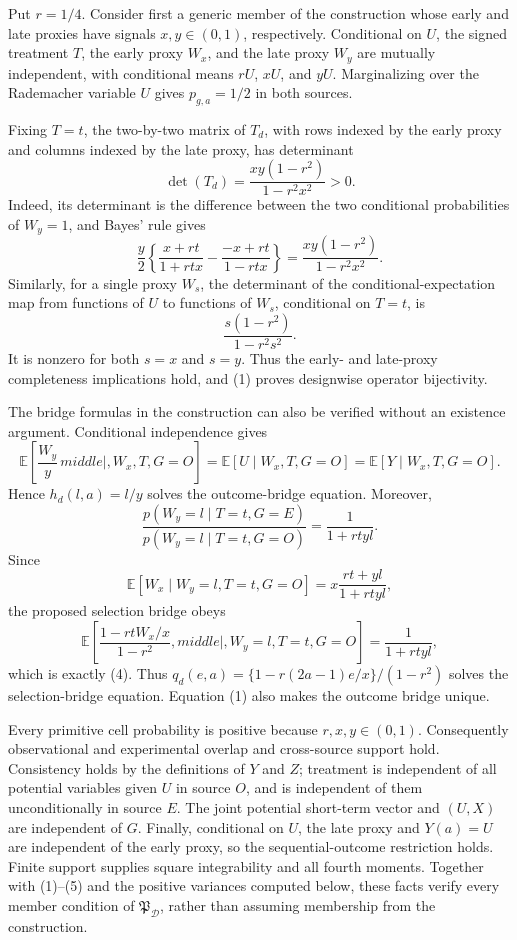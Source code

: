 Put \(r=1/4\).  Consider first a generic member of the construction whose early and late proxies have signals \(x,y\in(0,1)\), respectively.  Conditional on \(U\), the signed treatment \(T\), the early proxy \(W_x\), and the late proxy \(W_y\) are mutually independent, with conditional means \(rU\), \(xU\), and \(yU\).  Marginalizing over the Rademacher variable \(U\) gives \(p_{g,a}=1/2\) in both sources.

Fixing \(T=t\), the two-by-two matrix of \(T_d\), with rows indexed by the early proxy and columns indexed by the late proxy, has determinant
\[
 \det(T_d)=\frac{xy(1-r^2)}{1-r^2x^2}>0. \tag{1}
\]
Indeed, its determinant is the difference between the two conditional probabilities of \(W_y=1\), and Bayes' rule gives
\[
 \frac y2\left\{
 \frac{x+rt}{1+rtx}-\frac{-x+rt}{1-rtx}
 \right\}
 =\frac{xy(1-r^2)}{1-r^2x^2}.
\]
Similarly, for a single proxy \(W_s\), the determinant of the conditional-expectation map from functions of \(U\) to functions of \(W_s\), conditional on \(T=t\), is
\[
 \frac{s(1-r^2)}{1-r^2s^2}. \tag{2}
\]
It is nonzero for both \(s=x\) and \(s=y\).  Thus the early- and late-proxy completeness implications hold, and (1) proves designwise operator bijectivity.

The bridge formulas in the construction can also be verified without an existence argument.  Conditional independence gives
\[
 \mathbb E\!\left[\frac{W_y}{y}\,middle|,W_x,T,G=O\right]
 =\mathbb E[U\mid W_x,T,G=O]
 =\mathbb E[Y\mid W_x,T,G=O]. \tag{3}
\]
Hence \(h_d(l,a)=l/y\) solves the outcome-bridge equation.  Moreover,
\[
 \frac{p(W_y=l\mid T=t,G=E)}{p(W_y=l\mid T=t,G=O)}
 =\frac1{1+rtyl}. \tag{4}
\]
Since
\[
 \mathbb E[W_x\mid W_y=l,T=t,G=O]
 =x\frac{rt+yl}{1+rtyl},
\]
the proposed selection bridge obeys
\[
 \mathbb E\!\left[
 \frac{1-rtW_x/x}{1-r^2},middle|,W_y=l,T=t,G=O
 \right]
 =\frac1{1+rtyl}, \tag{5}
\]
which is exactly (4).  Thus \(q_d(e,a)=\{1-r(2a-1)e/x\}/(1-r^2)\) solves the selection-bridge equation.  Equation (1) also makes the outcome bridge unique.

Every primitive cell probability is positive because \(r,x,y\in(0,1)\).  Consequently observational and experimental overlap and cross-source support hold.  Consistency holds by the definitions of \(Y\) and \(Z\); treatment is independent of all potential variables given \(U\) in source \(O\), and is independent of them unconditionally in source \(E\).  The joint potential short-term vector and \((U,X)\) are independent of \(G\).  Finally, conditional on \(U\), the late proxy and \(Y(a)=U\) are independent of the early proxy, so the sequential-outcome restriction holds.  Finite support supplies square integrability and all fourth moments.  Together with (1)--(5) and the positive variances computed below, these facts verify every member condition of \(\mathfrak P_{\mathcal D}\), rather than assuming membership from the construction.

